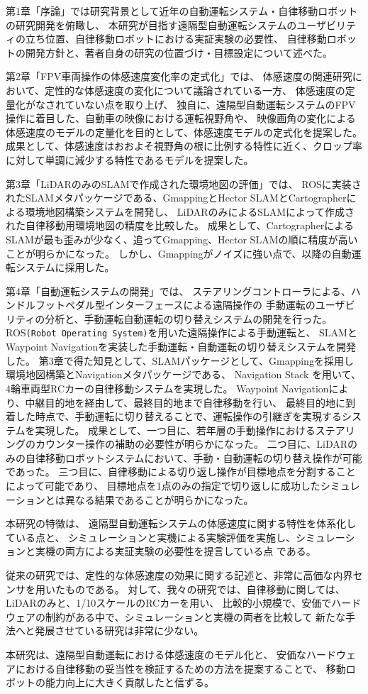 第1章「序論」では研究背景として近年の自動運転システム・自律移動ロボットの研究開発を俯瞰し、
本研究が目指す遠隔型自動運転システムのユーザビリティの立ち位置、自律移動ロボットにおける実証実験の必要性、
自律移動ロボットの開発方針と、著者自身の研究の位置づけ・目標設定について述べた。

第2章「FPV車両操作の体感速度変化率の定式化」では、
体感速度の関連研究において、定性的な体感速度の変化について議論されている一方、
体感速度の定量化がなされていない点を取り上げ、
独自に、遠隔型自動運転システムのFPV操作に着目した、自動車の映像における運転視野角や、
映像画角の変化による体感速度のモデルの定量化を目的として、体感速度モデルの定式化を提案した。
成果として、体感速度はおおよそ視野角の根に比例する特性に近く、クロップ率に対して単調に減少する特性であるモデルを提案した。

第3章「LiDARのみのSLAMで作成された環境地図の評価」では、
ROSに実装されたSLAMメタパッケージである、GmappingとHector SLAMとCartographerによる環境地図構築システムを開発し、
LiDARのみによるSLAMによって作成された自律移動用環境地図の精度を比較した。
成果として、CartographerによるSLAMが最も歪みが少なく、追ってGmapping、Hector SLAMの順に精度が高いことが明らかになった。
しかし、Gmappingがノイズに強い点で、以降の自動運転システムに採用した。

第4章「自動運転システムの開発」では、
ステアリングコントローラによる、ハンドルフットペダル型インターフェースによる遠隔操作の
手動運転のユーザビリティの分析と、手動運転自動運転の切り替えシステムの開発を行った。
ROS\verb|(Robot Operating System)|を用いた遠隔操作による手動運転と、
SLAMとWaypoint Navigationを実装した手動運転・自動運転の切り替えシステムを開発した。
第3章で得た知見として、SLAMパッケージとして、Gmappingを採用し環境地図構築とNavigationメタパッケージである、
Navigation Stack を用いて、4輪車両型RCカーの自律移動システムを実現した。
Waypoint Navigationにより、中継目的地を経由して、最終目的地まで自律移動を行い、
最終目的地に到着した時点で、手動運転に切り替えることで、運転操作の引継ぎを実現するシステムを実現した。
成果として、一つ目に、若年層の手動操作におけるステアリングのカウンター操作の補助の必要性が明らかになった。
二つ目に、LiDARのみの自律移動ロボットシステムにおいて、手動・自動運転の切り替え操作が可能であった。
三つ目に、自律移動による切り返し操作が目標地点を分割することによって可能であり、
目標地点を1点のみの指定で切り返しに成功したシミュレーションとは異なる結果であることが明らかになった。

本研究の特徴は、
遠隔型自動運転システムの体感速度に関する特性を体系化している点と、
シミュレーションと実機による実験評価を実施し、シミュレーションと実機の両方による実証実験の必要性を提言している点
である。


従来の研究では、定性的な体感速度の効果に関する記述と、非常に高価な内界センサを用いたものである。
対して、我々の研究では、自律移動に関しては、LiDARのみと、1/10スケールのRCカーを用い、
比較的小規模で、安価でハードウェアの制約がある中で、シミュレーションと実機の両者を比較して
新たな手法へと発展させている研究は非常に少ない。

本研究は、遠隔型自動運転における体感速度のモデル化と、
安価なハードウェアにおける自律移動の妥当性を検証するための方法を提案することで、
移動ロボットの能力向上に大きく貢献したと信ずる。